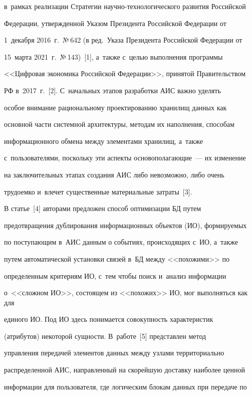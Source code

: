 в~рамках реализации Стратегии научно-технологического развития Российской 


Федерации, утвержденной Указом Президента Российской Федерации от 


1~де\-каб\-ря 2016~г.\ №\,642 (в ред.\ Указа Президента Российской Федерации от 


15~марта 2021~г.\ №\,143)~[1], а~также с~целью выполнения программы 


<<Цифровая экономика Российской Федерации>>, принятой Правительством 


РФ в~2017~г.~[2]. С~начальных этапов разработки АИС важно уделять 


особое внимание рациональному проектированию хранилищ данных как 


основной части сис\-тем\-ной архитектуры, методам их наполнения, способам 


информационного обмена между элементами хранилищ, а~также 


с~пользователями, поскольку эти аспекты основополагающие~--- их изменение 


на заключительных этапах создания АИС либо невозможно, либо очень 


трудоемко и~влечет существенные материальные затраты~[3]. 


  


  В статье~[4] авторами предложен способ оптимизации БД путем 


предотвращения дублирования информационных объектов (ИО), формируемых 


по поступающим в~АИС данным о событиях, происходящих с~ИО, а~также 


путем автоматической установки связей в~БД между <<похожими>> по 


определенным критериям ИО, с~тем чтобы поиск и~анализ информации 


о~<<сложном ИО>>, состоящем из <<похожих>> ИО, мог выполняться как для 


единого ИО. Под ИО здесь понимается совокупность характеристик 


(атрибутов) некоторой сущности.  В~работе~[5] представлен метод 


управления передачей элементов данных между узлами территориально 


распределенной АИС, направленный на скорейшую доставку наиболее ценной 


информации для пользователя, где логическим блокам данных при передаче по 


